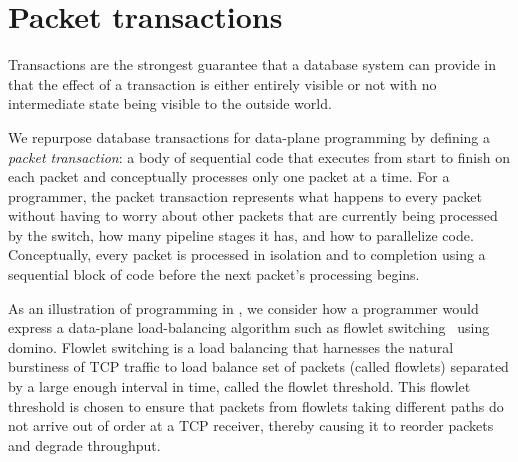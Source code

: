 \section{Packet transactions}

Transactions are the strongest guarantee that a database system can provide in
that the effect of a transaction is either entirely visible or not with no
intermediate state being visible to the outside world.

We repurpose database transactions for data-plane programming by defining a
\textit{packet transaction}: a body of sequential code that executes from start
to finish on each packet and conceptually processes only one packet at a time.
For a programmer, the packet transaction represents what happens to every
packet without having to worry about other packets that are currently being
processed by the switch, how many pipeline stages it has, and how to
parallelize code. Conceptually, every packet is processed in isolation and to
completion using a sequential block of code before the next packet's processing
begins.

As an illustration of programming in \pktlanguage, we consider how a programmer
would express a data-plane load-balancing algorithm such as flowlet
switching~\cite{flowlet} using domino. Flowlet switching is a load balancing
that harnesses the natural burstiness of TCP traffic to load balance set of
packets (called flowlets) separated by a large enough interval in time, called
the flowlet threshold. This flowlet threshold is chosen to ensure that packets
from flowlets taking different paths do not arrive out of order at a TCP
receiver, thereby causing it to reorder packets and degrade throughput.

